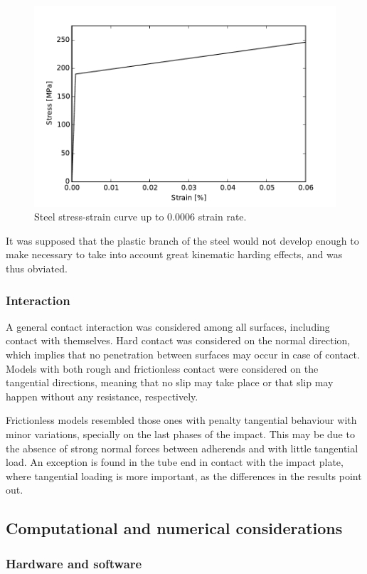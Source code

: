 \documentclass[cmfonts]{witpress}
\begin{document}
\begin{figure}
	\centering
	\includegraphics[width=0.7\linewidth]{figures/IMG_CUTRES/steel}
	\caption{Steel stress-strain curve up to $\num{0.0006}$ strain rate.}
	\label{fig:steel}
\end{figure}

It was supposed that the plastic branch of the steel would not develop enough to make necessary to take into account great kinematic harding effects, and was thus obviated.

\subsubsection{Interaction}

A general contact interaction was considered among all surfaces, including contact with themselves. Hard contact was considered on the normal direction, which implies that no penetration between surfaces may occur in case of contact. Models with both rough and frictionless contact were considered on the tangential directions, meaning that no slip may take place or that slip may happen without any resistance, respectively.

Frictionless models resembled those ones with penalty tangential behaviour with minor variations, specially on the last phases of the impact. This may be due to the absence of strong normal forces between adherends and with little tangential load. An exception is found in the tube end in contact with the impact plate, where tangential loading is more important, as the differences in the results point out.

\subsection{Computational and numerical considerations}

\subsubsection{Hardware and software}
\end{document}

